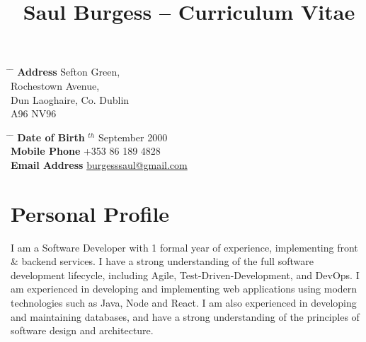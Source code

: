 \documentclass[10pt]{article} %
\begin{document}

\title{Saul Burgess -- Curriculum Vitae} %


\parbox{0.5\textwidth}{ %
    \begin{tabbing} %
        \hspace{3cm} \= \hspace{4cm} \= \kill %
        {\bf Address}  Sefton Green,\\ %
        \> Rochestown Avenue, \\
        \> Dun Laoghaire, Co. Dublin \\ %
        \> A96 NV96 \\
    \end{tabbing}} \hfill %
\parbox{0.5\textwidth}{ %
    \begin{tabbing} %
        \hspace{3cm} \= \hspace{4cm} \= \kill %
        {\bf Date of Birth} $^{th}$ September 2000 \\ %
        {\bf Mobile Phone} \> +353 86 189 4828 \\ %
        {\bf Email Address} \>
        \href{mailto:burgesssaul@gmail.com}{burgesssaul@gmail.com} \\ %
        \end{tabbing}}


\section{Personal Profile}

I am a Software Developer with 1 formal year of experience, implementing front
\& backend services. I have a strong understanding of the full software
development lifecycle, including Agile, Test-Driven-Development, and DevOps. I
am experienced in developing and implementing web applications using modern
technologies such as Java, Node and React. I am also experienced in developing
and maintaining databases, and have a strong understanding of the principles of
software design and architecture.
\end{document}
